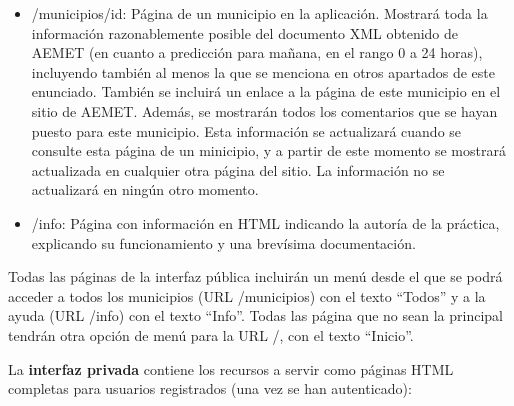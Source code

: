 \begin{itemize}
  \item /municipios/{id}: Página de un municipio en la aplicación. Mostrará toda la información razonablemente posible del documento XML obtenido de AEMET (en cuanto a predicción para mañana, en el rango 0 a 24 horas), incluyendo también al menos la que se menciona en otros apartados de este enunciado. También se incluirá un enlace a la página de este municipio en el sitio de AEMET. Además, se mostrarán todos los comentarios que se hayan puesto para este municipio. Esta información se actualizará cuando se consulte esta página de un minicipio, y a partir de este momento se mostrará actualizada en cualquier otra página del sitio. La información no se actualizará en ningún otro momento.
 
  \item /info: Página con información en HTML indicando la autoría de la práctica, explicando su funcionamiento y una brevísima documentación.

\end{itemize}

Todas las páginas de la interfaz pública incluirán un menú desde el que se podrá acceder a todos los municipios (URL /municipios) con el texto ``Todos'' y a la ayuda (URL /info) con el texto ``Info''. Todas las página que no sean la principal tendrán otra opción de menú para la URL /, con el texto ``Inicio''.

La {\bf interfaz privada} contiene los recursos a servir como páginas HTML completas para usuarios registrados (una vez se han autenticado):


